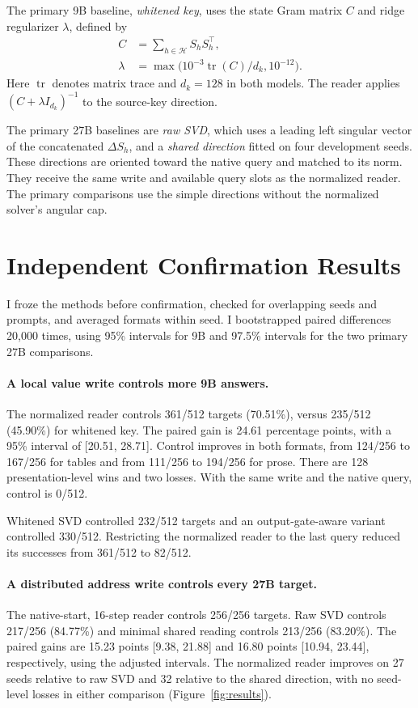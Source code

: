\documentclass[letterpaper]{article}
\begin{document}
The primary 9B baseline, \emph{whitened key}, uses the state Gram
matrix $C$ and ridge regularizer $\lambda$, defined by
\begin{align*}
C&=\sum_{h\in\mathcal H}S_hS_h^\top,\\
\lambda&=\max\bigl(10^{-3}\operatorname{tr}(C)/d_k,10^{-12}\bigr).
\end{align*}
Here $\operatorname{tr}$ denotes matrix trace and $d_k=128$ in both
models. The reader applies $(C+\lambda I_{d_k})^{-1}$ to the source-key
direction.

The primary 27B baselines are \emph{raw SVD}, which uses a leading left
singular vector of the concatenated $\Delta S_h$, and a \emph{shared
direction} fitted on four development seeds. These directions are
oriented toward the native query and matched to its norm. They receive
the same write and available query slots as the normalized reader.
The primary comparisons use the simple directions without the
normalized solver's angular cap.



\section{Independent Confirmation Results}
I froze the methods before confirmation, checked for overlapping seeds
and prompts, and averaged formats within seed. I bootstrapped paired
differences 20,000 times, using 95\% intervals for 9B and 97.5\%
intervals for the two primary 27B comparisons.

\paragraph{A local value write controls more 9B answers.}
The normalized reader controls 361/512 targets (70.51\%), versus
235/512 (45.90\%) for whitened key. The paired gain is 24.61 percentage
points, with a 95\% interval of [20.51, 28.71]. Control improves in both
formats, from 124/256 to 167/256 for tables and from 111/256 to 194/256
for prose. There are 128 presentation-level wins and two losses.
With the same write and the native query, control is 0/512.

Whitened SVD controlled 232/512 targets and an output-gate-aware
variant controlled 330/512. Restricting the normalized reader to the
last query reduced its successes from 361/512 to 82/512.

\paragraph{A distributed address write controls every 27B target.}
The native-start, 16-step reader controls 256/256 targets. Raw SVD
controls 217/256 (84.77\%) and minimal shared reading controls 213/256
(83.20\%). The paired gains are 15.23 points [9.38, 21.88] and 16.80
points [10.94, 23.44], respectively, using the adjusted intervals.
The normalized reader improves on 27 seeds relative to raw SVD and
32 relative to the shared direction, with no seed-level losses in
either comparison (Figure~\ref{fig:results}).
\end{document}
